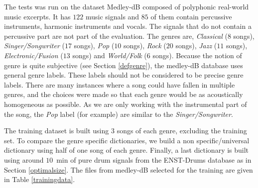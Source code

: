 \documentclass{article}
\begin{document}
The tests was run on the dataset Medley-dB \cite{bittner2014medleydb} composed of polyphonic real-world music excerpts. It has $122$ music signals and $85$ of them contain percussive instruments, harmonic instruments and vocals. The signals that do not contain a percussive part are not part of the evaluation. The genres are, \emph{Classical} ($8$ songs), \emph{Singer/Songwriter} ($17$ songs), \emph{Pop} ($10$ songs), \emph{Rock} ($20$ songs), \emph{Jazz} ($11$ songs), \emph{Electronic/Fusion} ($13$ songs) and \emph{World/Folk} ($6$ songs). Because the notion of genre is quite subjective (see Section \ref{defgenre}), the medley-dB database uses general genre labels. These labels should not be considered to be precise genre labels. There are many instances where a song could have fallen in multiple genres, and the choices were made so that each genre would be as acoustically homogeneous as possible. As we are only working with the instrumental part of the song, the \emph{Pop} label (for example) are similar to the \emph{Singer/Songwriter}.

The training dataset is built using $3$ songs of each genre, excluding the training set. To compare the genre specific dictionaries, we build a non specific/universal dictionary using half of one song of each genre. Finally, a last dictionary is built using around $10$~min of pure drum signals from the ENST-Drums database as in Section \ref{optimalsize}. The files from medley-dB selected for the training are given in Table \ref{trainingdata}. 
\end{document}
